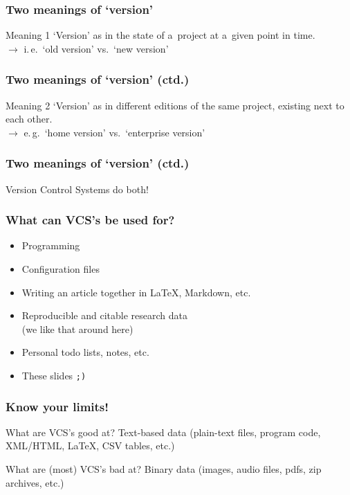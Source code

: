 \documentclass[12pt]{beamer}
\begin{document}
\begin{frame}
  \frametitle{Two meanings of `version'}

  \begin{block}{Meaning 1}
    `Version' as in the state of a~project at a~given point in time.\\
    $\rightarrow$ i.\,e.\ `old version' vs.\ `new version'
  \end{block}
\end{frame}

\begin{frame}
  \frametitle{Two meanings of `version' (ctd.)}

  \begin{block}{Meaning 2}
    `Version' as in different editions of the same project, existing next to
    each other.\\
    $\rightarrow$ e.\,g.\ `home version' vs.\ `enterprise version'
  \end{block}
\end{frame}

\begin{frame}
  \frametitle{Two meanings of `version' (ctd.)}

  Version Control Systems do both!
\end{frame}

\begin{frame}
  \frametitle{What can VCS's be used for?}

  \begin{itemize}
    \item Programming
    \item Configuration files
    \item Writing an article together in \LaTeX, Markdown, etc.
    \item \alert{Reproducible and citable research data}\\
      (we like that around here)
    \item Personal todo lists, notes, etc.
    \item These slides \texttt{;)}
  \end{itemize}
\end{frame}

\begin{frame}
  \frametitle{Know your limits!}

  \begin{block}{What are VCS's good at?}
    Text-based data
    (plain-text files, program code, XML/HTML, \LaTeX, CSV tables, etc.)
  \end{block}

  \begin{block}{What are (most) VCS's bad at?}
    Binary data
    (images, audio files, pdfs, zip archives, etc.)
  \end{block}
\end{frame}
\end{document}
